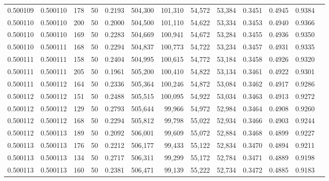\begin{tabular}{rrrrrrrrrrrrr}
0.500109 & 0.500110 &   178 &  50 &                                     0.2193 & 504,300 & 101,310 &  54,572 &  53,384 & 0.3451 & 0.4945 & 0.9384 \\
0.500110 & 0.500110 &   200 &  50 &                                     0.2000 & 504,500 & 101,110 &  54,622 &  53,334 & 0.3453 & 0.4940 & 0.9366 \\
0.500110 & 0.500110 &   169 &  50 &                                     0.2283 & 504,669 & 100,941 &  54,672 &  53,284 & 0.3455 & 0.4936 & 0.9350 \\
0.500110 & 0.500111 &   168 &  50 &                                     0.2294 & 504,837 & 100,773 &  54,722 &  53,234 & 0.3457 & 0.4931 & 0.9335 \\
0.500111 & 0.500111 &   158 &  50 &                                     0.2404 & 504,995 & 100,615 &  54,772 &  53,184 & 0.3458 & 0.4926 & 0.9320 \\
0.500111 & 0.500111 &   205 &  50 &                                     0.1961 & 505,200 & 100,410 &  54,822 &  53,134 & 0.3461 & 0.4922 & 0.9301 \\
0.500111 & 0.500112 &   164 &  50 &                                     0.2336 & 505,364 & 100,246 &  54,872 &  53,084 & 0.3462 & 0.4917 & 0.9286 \\
0.500112 & 0.500112 &   151 &  50 &                                     0.2488 & 505,515 & 100,095 &  54,922 &  53,034 & 0.3463 & 0.4913 & 0.9272 \\
0.500112 & 0.500112 &   129 &  50 &                                     0.2793 & 505,644 &  99,966 &  54,972 &  52,984 & 0.3464 & 0.4908 & 0.9260 \\
0.500112 & 0.500112 &   168 &  50 &                                     0.2294 & 505,812 &  99,798 &  55,022 &  52,934 & 0.3466 & 0.4903 & 0.9244 \\
0.500112 & 0.500113 &   189 &  50 &                                     0.2092 & 506,001 &  99,609 &  55,072 &  52,884 & 0.3468 & 0.4899 & 0.9227 \\
0.500113 & 0.500113 &   176 &  50 &                                     0.2212 & 506,177 &  99,433 &  55,122 &  52,834 & 0.3470 & 0.4894 & 0.9211 \\
0.500113 & 0.500113 &   134 &  50 &                                     0.2717 & 506,311 &  99,299 &  55,172 &  52,784 & 0.3471 & 0.4889 & 0.9198 \\
0.500113 & 0.500113 &   160 &  50 &                                     0.2381 & 506,471 &  99,139 &  55,222 &  52,734 & 0.3472 & 0.4885 & 0.9183 \\

\end{tabular}
